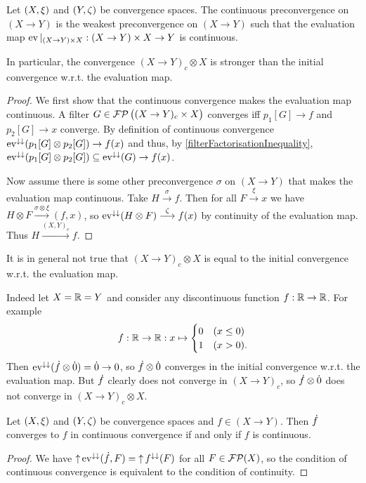 \begin{lemma} \label{evalMapContinuous}
Let $\sSet{X,\xi}$ and $\sSet{Y,\zeta}$ be convergence spaces. The continuous preconvergence on $(X\to Y)$ is the weakest preconvergence on $(X\to Y)$ such that the evaluation map $\operatorname{ev}|_{(X\to Y)\times X}: (X\to Y)\times X \to Y$ is continuous.

In particular, the convergence $(X\to Y)_c\otimes X$ is stronger than the initial convergence w.r.t. the evaluation map.
\end{lemma}
\begin{proof}
We first show that the continuous convergence makes the evaluation map continuous. A filter $G\in\operatorname{\mathcal{FP}}\big((X\to Y)_c\times X\big)$ converges iff $p_1[G]\to f$ and $p_2[G]\to x$ converge. By definition of continuous convergence $\operatorname{ev}^{\downarrow\downarrow}(p_1[G] \otimes p_2[G]) \to f(x)$ and thus, by \ref{filterFactorisationInequality}, $\operatorname{ev}^{\downarrow\downarrow}(p_1[G] \otimes p_2[G]) \subseteq \operatorname{ev}^{\downarrow\downarrow}(G) \to f(x)$.

Now assume there is some other preconvergence $\sigma$ on $(X\to Y)$ that makes the evaluation map continuous. Take $H \overset{\sigma}{\longrightarrow} f$. Then for all $F\overset{\xi}{\longrightarrow}x$ we have $H\otimes F\overset{\sigma\otimes \xi}{\longrightarrow} (f,x)$, so $\operatorname{ev}^{\downarrow\downarrow}(H\otimes F) \overset{\zeta}{\longrightarrow} f(x)$ by continuity of the evaluation map. Thus $H\overset{(X,Y)_c}{\longrightarrow} f$.
\end{proof}

\begin{example}
It is in general not true that $(X\to Y)_c\otimes X$ is equal to the initial convergence w.r.t. the evaluation map.

Indeed let $X=\mathbb{R}=Y$ and consider any discontinuous function $f:\mathbb{R}\to \mathbb{R}$. For example
\[ f: \mathbb{R}\to \mathbb{R}: x\mapsto \begin{cases}
0 & (x\leq 0) \\
1 & (x > 0).
\end{cases} \]
Then $\operatorname{ev}^{\downarrow\downarrow}(\dot{f}\otimes \dot{0}) = \dot{0} \to 0$, so $\dot{f}\otimes \dot{0}$ converges in the initial convergence w.r.t. the evaluation map. But $\dot{f}$ clearly does not converge in $(X\to Y)_c$, so $\dot{f}\otimes \dot{0}$ does not converge in $(X\to Y)_c\otimes X$.
\end{example}

\begin{lemma} \label{continuousConvergenceIffContinuousPrincipalUltrafilter}
Let $\sSet{X,\xi}$ and $\sSet{Y,\zeta}$ be convergence spaces and $f\in (X\to Y)$. Then $\dot{f}$ converges to $f$ in continuous convergence \textup{if and only if} $f$ is continuous.
\end{lemma}
\begin{proof}
We have $\operatorname{\uparrow}\operatorname{ev}^{\downarrow\downarrow}(\dot{f}, F) = \operatorname{\uparrow} f^{\downarrow\downarrow}(F)$ for all $F\in \operatorname{\mathcal{FP}}(X)$, so the condition of continuous convergence is equivalent to the condition of continuity.
\end{proof}

